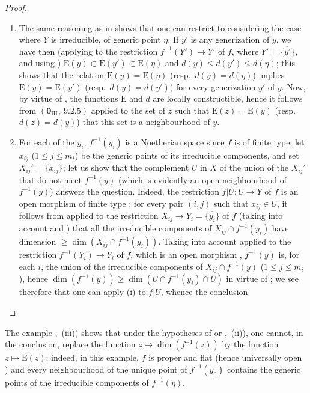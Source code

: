 \begin{proof}
\begin{enumerate}[label=(\roman*)]
  \item The same reasoning as in  shows that one can restrict to considering the case where $Y$ is irreducible, of generic point $\eta$.
  If $y'$ is any generization of $y$, we have then (applying  to the restriction $f^{-1}(Y')\to Y'$ of $f$, where $Y'=\overline{\{y'\}}$, and using ) $\mathrm{E}(y)\subset\mathrm{E}(y')\subset\mathrm{E}(\eta)$ and $d(y)\leq d(y')\leq d(\eta)$; this shows that the relation $\mathrm{E}(y)=\mathrm{E}(\eta)$ (resp.\ $d(y)=d(\eta)$) implies $\mathrm{E}(y)=\mathrm{E}(y')$ (resp.\ $d(y)=d(y')$) for every generization $y'$ of $y$.
  Now, by virtue of , the functions $\mathrm{E}$ and $d$ are locally constructible, hence it follows from $(\mathbf{0}_{\mathrm{III}},~9.2.5)$ applied to the set of $z$ such that $\mathrm{E}(z)=\mathrm{E}(y)$ (resp.\ $d(z)=d(y)$) that this set is a neighbourhood of $y$.

  \item For each of the $y_i$, $f^{-1}(y_i)$ is a Noetherian space since $f$ is of finite type; let $x_{ij}$ ($1\leq j\leq m_i$) be the generic points of its irreducible components, and set $X_{ij}'=\overline{\{x_{ij}\}}$; let us show that the complement $U$ in $X$ of the union of the $X_{ij}'$ that do not meet $f^{-1}(y)$ (which is evidently an open neighbourhood of $f^{-1}(y)$) answers the question.
  Indeed, the restriction $f|U:U\to Y$ of $f$ is an open morphism of finite type ; for every pair $(i,j)$ such that $x_{ij}\in U$, it follows from  applied to the restriction $X_{ij}\to Y_i=\overline{\{y_i\}}$ of $f$ (taking into account  and ) that all the irreducible components of $X_{ij}\cap f^{-1}(y_i)$ have dimension $\geq\dim(X_{ij}\cap f^{-1}(y_i))$.
  Taking into account  applied to the restriction $f^{-1}(Y_i)\to Y_i$ of $f$, which is an open morphism , $f^{-1}(y)$ is, for each $i$, the union of the irreducible components of $X_{ij}\cap f^{-1}(y)$ ($1\leq j\leq m_i$), hence $\dim(f^{-1}(y))\geq\dim(U\cap f^{-1}(y_i)\cap U)$ in virtue of ; we see therefore that one can apply (i) to $f|U$, whence the conclusion.
\end{enumerate}
\end{proof}

\begin{remark}[14.2.7]
\label{IV.14.2.7}
The example ,~(iii)) shows that under the hypotheses of  or ,~(ii)), one cannot, in the conclusion, replace the function $z\mapsto\dim(f^{-1}(z))$ by the function $z\mapsto\mathrm{E}(z)$; indeed, in this example, $f$ is proper and flat (hence universally open ) and every neighbourhood of the unique point of $f^{-1}(y_0)$ contains the generic points of the irreducible components of $f^{-1}(\eta)$.
\end{remark}

